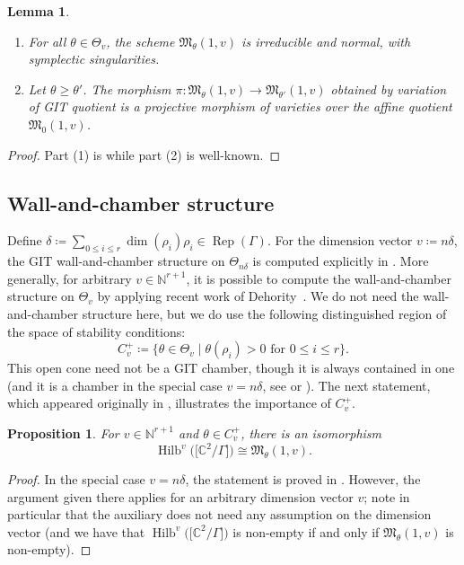 \documentclass[pdftex]{sigma}%
\newtheorem{Lemma}[Theorem]{Lemma}
\newtheorem{Proposition}[Theorem]{Proposition}
 { \theoremstyle{definition}
\newtheorem{Definition}[Theorem]{Definition}
\newtheorem{Example}[Theorem]{Example}
\newtheorem{Remark}[Theorem]{Remark}
\newtheorem{remarks}[theorem]{Remarks}
}
\newcommand{\SC}{\mathbb{C}} %
\newcommand{\Rep}{\operatorname{Rep}}
\DeclareMathOperator{\Hilb}{\mathrm{Hilb}}
\numberwithin{equation}{section}
\begin{document}
\begin{Lemma}\label{lem:quiver}\quad
\begin{enumerate}\itemsep=0pt
\item[$1.$] For all $\theta \in \Theta_v$, the scheme $\mathfrak{M}_{\theta}(1,v)$ is irreducible and normal, with symplectic singularities.
\item[$2.$] Let $ \theta \geq \theta'$. The morphism $\pi\colon \mathfrak{M}_{\theta}(1,v) \to \mathfrak{M}_{\theta'}(1,v)$ obtained by variation of GIT quotient is a projective morphism of varieties over the affine quotient $\mathfrak{M}_{0}(1,v)$.
\end{enumerate}
\end{Lemma}

\begin{proof}
Part (1) is \cite[Theorem 1.2, Proposition 3.21]{bellamy2016symplectic} while part (2) is well-known.
\end{proof}

\subsection{Wall-and-chamber structure}
\label{subsec:wallandcham}

Define $\delta\coloneqq \sum_{0\leq i\leq r} \dim(\rho_i)\rho_i\in \Rep(\Gamma)$. For the dimension vector $v\coloneqq n\delta$, the GIT wall-and-chamber structure on $\Theta_{n\delta}$ is computed explicitly in \cite[Theorem 4.6]{bellamy2020birational}. More generally, for arbitrary $v \in \mathbb{N}^{r+1}$,
it is possible to compute the wall-and-chamber structure on $\Theta_v$ by applying recent work of
Dehority~\cite[Proposition 4.8]{dehority2020affinizations}. We do not need the wall-and-chamber structure here, but we do use the following distinguished region of the space of stability conditions:
\[ C^{+}_v\coloneqq \{\theta \in \Theta_v \mid \theta(\rho_i) > 0 \textrm{ for } 0 \leq i \leq r \}. \]
This open cone need not be a GIT chamber, though it is always contained in one (and it is a chamber in the special case $v=n\delta$, see \cite[Example~2.1]{bellamy2020birational} or \cite[Section~2.8]{nakajima2009quiver}).
The next statement, which appeared originally in \cite[Section~2]{nakajima2002geometric}, illustrates the importance of $C^{+}_v$.
\begin{Proposition}
\label{prop:hilbiso}
For $v \in \mathbb{N}^{r+1}$ and $\theta \in C^{+}_v$, there is an isomorphism
\[ \Hilb^{v}\big(\big[\SC^2/\Gamma\big]\big) \cong \mathfrak{M}_{\theta}(1,v). \]
\end{Proposition}
\begin{proof}
In the special case $v=n\delta$,
the statement is proved in \cite[Theorem 4.6]{kuznetsov2007quiver}. However, the argument given there applies for
an arbitrary dimension vector $v$; note in particular that the auxiliary \cite[Corollary 3.5]{kuznetsov2007quiver}
does not need any assumption on the dimension vector (and we have that $\Hilb^{v}\big(\big[\SC^2/\Gamma\big]\big)$ is non-empty if and only if $\mathfrak{M}_{\theta}(1,v)$ is non-empty).
\end{proof}
\end{document}
